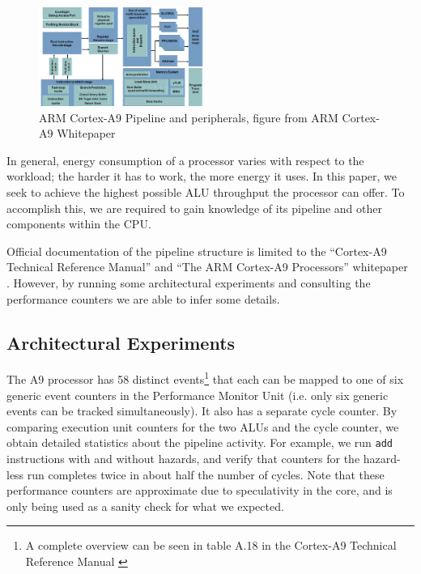 \begin{figure}
    \begin{centering}
        \includegraphics[width=0.48\textwidth]{figures/A9-Pipeline-hres}
        \caption{ARM Cortex-A9 Pipeline and peripherals,\hfill
        figure from ARM Cortex-A9 Whitepaper\cite{a9whitepaper}}
        \label{fig:pipeline}
    \end{centering}
\end{figure}

In general, energy consumption of a processor varies with respect to the
workload; the harder it has to work, the more energy it uses. In this paper, we
seek to achieve the highest possible ALU throughput the processor can offer. To
accomplish this, we are required to gain knowledge of its pipeline and other
components within the CPU.

Official documentation of the pipeline structure is limited to the ``Cortex-A9
Technical Reference Manual'' \cite{armtech} and ``The ARM Cortex-A9 Processors''
whitepaper \cite{a9whitepaper}. However, by running some architectural
experiments and consulting the performance counters we are able to
infer some details.

\subsection{Architectural Experiments}
\label{arch_experiments}
The A9 processor has 58 distinct events\footnote{A complete overview can be seen
in table A.18 in the Cortex-A9 Technical Reference Manual \cite{armtech}} that
each can be mapped to one of six generic event counters in the Performance
Monitor Unit (i.e. only six generic events can be tracked simultaneously). It
also has a separate cycle counter. By comparing execution unit counters for the
two ALUs and the cycle counter, we obtain detailed statistics about the
pipeline activity. For example, we run \texttt{add} instructions with and
without hazards, and verify that counters for the hazard-less run completes
twice in about half the number of cycles. Note that these performance counters are
approximate due to speculativity in the core, and is only being used as a sanity
check for what we expected.

